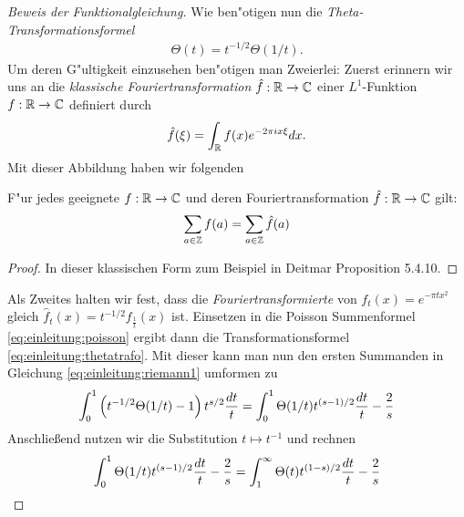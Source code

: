 \begin{proof}[Beweis der Funktionalgleichung]
		Wie ben"otigen nun die \emph{Theta-Transformationsformel}
		\begin{align}
			\Theta(t) = t^{-1/2} \Theta(1/t).\label{eq:einleitung:thetatrafo}
		\end{align}
		Um deren G"ultigkeit einzusehen ben"otigen man Zweierlei: 
		Zuerst erinnern wir uns an die \emph{klassische Fouriertransformation} $\hat{f}:\R\to\Komplex$ einer $L^1$-Funktion $f:\R\to\Komplex$ definiert durch
		\begin{align*}
			\hat{f}(\xi) = \int_\R f(x)e^{-2\pi i x \xi} \dx.
		\end{align*}
		Mit dieser Abbildung haben wir folgenden
		\begin{satz}
			\label{satz:einleitung:poisson}
			F"ur jedes geeignete $f:\R \to \Komplex$ und deren Fouriertransformation $\hat{f}:\R \to \Komplex$ gilt:
			\begin{align}
				\sum_{a \in \Z} f(a) = \sum_{a \in \Z} \hat{f}(a) \label{eq:einleitung:poisson}
			\end{align}
		\end{satz}
		\begin{proof}
			In dieser klassischen Form zum Beispiel in Deitmar \cite{deitmar2010} Proposition 5.4.10.
		\end{proof}
		Als Zweites halten wir fest, dass die \emph{Fouriertransformierte} von $f_t(x) = e^{-\pi t x^2}$ gleich $\hat{f}_t(x)= t^{-1/2}f_{\frac{1}{t}}(x)$ ist.
		Einsetzen in die Poisson Summenformel \eqref{eq:einleitung:poisson} ergibt dann die Transformationsformel \eqref{eq:einleitung:thetatrafo}.
		Mit dieser kann man nun den ersten Summanden in Gleichung \eqref{eq:einleitung:riemann1} umformen zu
		\begin{align*}		
			\int_{0}^{1} \left(t^{-1/2}\Theta(1/t)-1\right) t^{s/2}  \frac{\dx[t]}{t} 
				= \int_{0}^{1}\Theta(1/t) t^{(s-1)/2}  \frac{\dx[t]}{t} - \frac{2}{s}
		\end{align*}
		Anschließend nutzen wir die Substitution $t \mapsto t^{-1}$ und rechnen
		\begin{align*}
			\int_{0}^{1}\Theta(1/t) t^{(s-1)/2}  \frac{\dx[t]}{t} - \frac{2}{s}
				&= \int_{1}^{\infty} \Theta(t) t^{(1-s)/2}  \frac{\dx[t]}{t} - \frac{2}{s}\\

\end{align*}
\end{proof}
